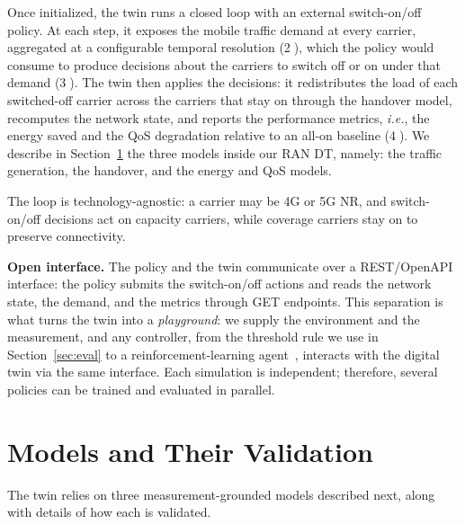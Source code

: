\documentclass[sigconf, 10pt, anonymous, review]{acmart}
\newcommand{\circled}[1]{\textcircled{\footnotesize #1}}  %
\newcommand{\ie}{\textit{i.e.},\xspace}
\begin{document}
Once initialized, the twin runs a closed loop with an external switch-on/off policy. At each step, it exposes the mobile traffic demand at every carrier, aggregated at a configurable temporal resolution (\circled{2}), which the policy would consume to produce decisions about the carriers to switch off or on under that demand (\circled{3}). 
The twin then applies the decisions: it redistributes the load of each switched-off carrier across the carriers that stay on through the handover model, recomputes the network state, and reports the performance metrics, \ie the energy saved and the \ac{QoS} degradation relative to an all-on baseline (\circled{4}). 
We describe in Section~\ref{sec:components} the three models inside our \ac{RAN} \ac{DT}, namely: the traffic generation, the handover, and the energy and \ac{QoS} models.

The loop is technology-agnostic: a carrier may be 4G or 5G NR, and switch-on/off decisions act on capacity carriers, while coverage carriers stay on to preserve connectivity.
\vspace*{0.3em}

\noindent\textbf{Open interface.} 
The policy and the twin communicate over a REST/OpenAPI interface: the policy submits the switch-on/off actions and reads the network state, the demand, and the metrics through GET endpoints. 
This separation is what turns the twin into a \textit{playground}: we supply the environment and the measurement, and any controller, from the threshold rule we use in Section~\ref{sec:eval} to a reinforcement-learning agent~\cite{rl2021}, interacts with the digital twin via the same interface. 
Each simulation is independent; therefore, several policies can be trained and evaluated in parallel.

\vspace{-5pt}
\section{Models and Their Validation}
\label{sec:components}
The twin relies on three measurement-grounded models described next, along with details of how each is validated.

\vspace{-8pt}
\end{document}
